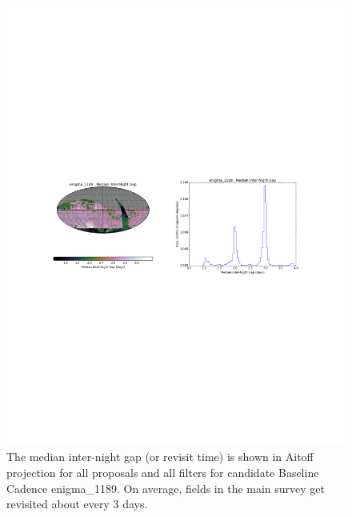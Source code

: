 \documentclass[manuscript]{article}
\begin{document}
\begin{figure}[t!]
\vskip -4.1in
\hskip -0.5in
\includegraphics[angle=0,width=1.19\hsize,clip]{enigma1189_interGapAll.pdf}
\vskip -4.0in
\caption{The median inter-night gap (or revisit time) is shown in Aitoff projection 
for all proposals and all filters for candidate Baseline Cadence enigma\_1189.
On average, fields in the main survey get revisited about every 3 days.} 
\label{fig:enigmaGapAll}
\end{figure}
\end{document}
